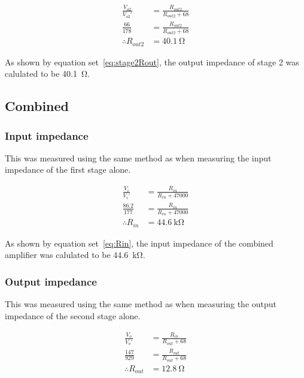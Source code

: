 \documentclass[a4paper,11pt]{article}
\begin{document}
            \begin{subequations} \label{eq:stage2Rout}
            \begin{align}
                \frac{V_{o2}}{V_{o2}'} &= \frac{R_{out2}}{R_{out2} + 68}   \\
                \frac{66}{178} &= \frac{R_{out2}}{R_{out2} + 68}   \\
                \therefore R_{out2} &= \SI{40.1}{\ohm}
            \end{align}
            \end{subequations}
            
            As shown by equation set~\ref{eq:stage2Rout}, the output impedance of stage 2 was calulated to be \SI{40.1}{\ohm}.
            
    \subsection{Combined}
        \subsubsection{Input impedance}
            This was measured using the same method as when measuring the input impedance of the first stage alone.
            
            \begin{subequations} \label{eq:Rin}
            \begin{align}
                \frac{V_{i}}{V_{i}'} &= \frac{R_{in}}{R_{in} + 47000}   \\
                \frac{86.2}{177} &= \frac{R_{in}}{R_{in} + 47000}   \\
                \therefore R_{in} &= \SI{44.6}{\kilo\ohm}
            \end{align}
            \end{subequations}
            
            As shown by equation set~\ref{eq:Rin}, the input impedance of the combined amplifier was calulated to be \SI{44.6}{\kilo\ohm}.
            
        \subsubsection{Output impedance}
            This was measured using the same method as when measuring the output impedance of the second stage alone.
            
            \begin{subequations} \label{eq:Rout}
            \begin{align}
                \frac{V_{o}}{V_{o}'} &= \frac{R_{in}}{R_{out} + 68}   \\
                \frac{147}{929} &= \frac{R_{out}}{R_{out} + 68}   \\
                \therefore R_{out} &= \SI{12.8}{\ohm}
            \end{align}
            \end{subequations}
            
\end{document}
